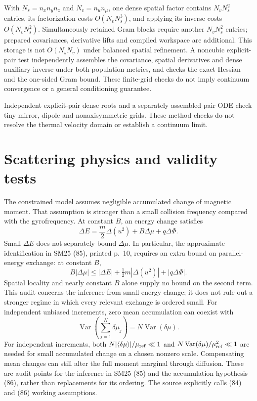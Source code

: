 \documentclass[11pt,letterpaper]{article}
\begin{document}
With $N_s=n_xn_yn_z$ and $N_v=n_un_\mu$, one dense spatial factor contains
$N_vN_s^2$ entries, its factorization costs $O(N_vN_s^3)$, and applying its
inverse costs $O(N_vN_s^2)$. Simultaneously retained Gram blocks require another
$N_vN_s^2$ entries; prepared covariances, derivative lifts and compiled workspace
are additional. This storage is not $O(N_sN_v)$ under balanced spatial
refinement. A noncubic explicit-pair test independently assembles the covariance,
spatial derivatives and dense auxiliary inverse under both population metrics,
and checks the exact Hessian and the one-sided Gram bound. These finite-grid
checks do not imply continuum convergence or a general conditioning guarantee.


Independent explicit-pair dense roots and a separately assembled pair ODE
check tiny mirror, dipole and nonaxisymmetric grids. These method checks do
not resolve the thermal velocity domain or establish a continuum limit.

\section{Scattering physics and validity tests}

The constrained model assumes negligible accumulated change of magnetic moment.
That assumption is stronger than a small collision frequency compared with the
gyrofrequency. At constant $B$, an energy change satisfies
\begin{equation}
 \Delta E=\frac{m}{2}\Delta(u^2)+B\Delta\mu+q\Delta\Phi.
 \label{eq:energychange}
\end{equation}
Small $\Delta E$ does not separately bound $\Delta\mu$.
In particular, the approximate identification in SM25 (85), printed p.~10,
requires an extra bound on parallel-energy exchange: at constant $B$,
\begin{equation}
 B|\Delta\mu|\le |\Delta E|+
 \tfrac12m|\Delta(u^2)|+|q\Delta\Phi|.
\end{equation}
Spatial locality and nearly constant $B$ alone supply no bound on the second
term. This audit concerns the inference from small energy change; it does not
rule out a stronger regime in which every relevant exchange is ordered small. For independent unbiased
increments, zero mean accumulation can coexist with
\begin{equation}
 \operatorname{Var}\left(\sum_{j=1}^N\delta\mu_j\right)
 =N\operatorname{Var}(\delta\mu).
\end{equation}
For independent increments, both
$N|\langle\delta\mu\rangle|/\mu_{\rm ref}\ll1$ and
$N\operatorname{Var}(\delta\mu)/\mu_{\rm ref}^2\ll1$ are needed for small accumulated
change on a chosen nonzero scale. Compensating mean changes can still alter the
full moment marginal through diffusion. These are audit points for the
inference in SM25 (85) and the accumulation hypothesis (86), rather than
replacements for its ordering. The source explicitly calls (84) and (86)
working assumptions.
\end{document}
